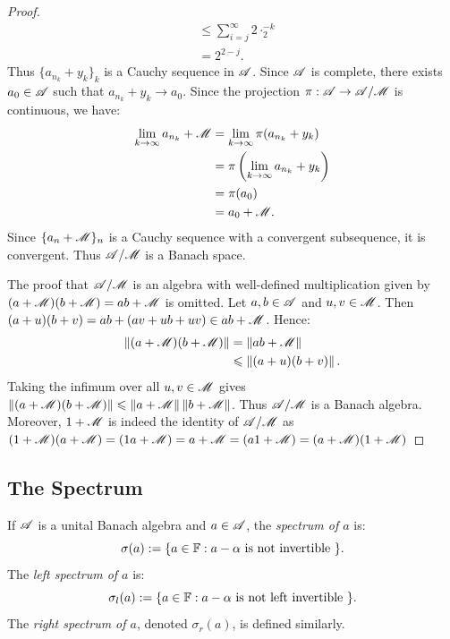 \begin{proof}
\begin{align*}
			&\leq \sum_{i=j}^{\infty} 2\cdot_2^{-k}  \\
			&= 2^{2-j}.
		\end{align*}
		Thus $\{a_{n_k} + y_k\}_k$ is a Cauchy sequence in $\mathscr{A}$. Since $\mathscr{A}$ is complete, there exists $a_0 \in \mathscr{A}$ such that $a_{n_k} + y_k \rightarrow a_0$. Since the projection $\pi:\mathscr{A} \rightarrow \mathscr{A}/\mathscr{M}$ is continuous, we have:
		\begin{align*}
			\lim_{k \rightarrow \infty}a_{n_k} + \mathscr{M}
			&= \lim_{k \rightarrow \infty} \pi(a_{n_k} + y_k) \\
			&= \pi\left(\lim_{k \rightarrow \infty} a_{n_k} + y_k \right) \\
			&= \pi(a_0) \\
			&= a_0 + \mathscr{M}.
		\end{align*}
		Since $\{a_n + \mathscr{M}\}_n$ is a Cauchy sequence with a convergent subsequence, it is convergent. Thus $\mathscr{A}/\mathscr{M}$ is a Banach space.

		The proof that $\mathscr{A}/\mathscr{M}$ is an algebra with well-defined multiplication given by $(a+\mathscr{M})(b+\mathscr{M}) = ab + \mathscr{M}$ is omitted. Let $a,b \in \mathscr{A}$ and $u,v \in \mathscr{M}$. Then $(a+u)(b+v) = ab + (av + ub + uv) \in ab+\mathscr{M}$. Hence:
		\begin{align*}
			\left\lVert (a+\mathscr{M})(b+\mathscr{M}) \right\rVert
			&= \left\lVert ab + \mathscr{M} \right\rVert \\
			&\leqslant \left\lVert (a+u)(b+v) \right\rVert.
		\end{align*}
		Taking the infimum over all $u,v \in \mathscr{M}$ gives $\left\lVert (a+\mathscr{M})(b+\mathscr{M}) \right\rVert \leqslant \left\lVert a+\mathscr{M} \right\rVert \left\lVert b+\mathscr{M} \right\rVert$. Thus $\mathscr{A}/\mathscr{M}$ is a Banach algebra. Moreover, $1 + \mathscr{M}$ is indeed the identity of $\mathscr{A}/\mathscr{M}$ as $(1+\mathscr{M})(a+\mathscr{M}) = (1a + \mathscr{M}) = a + \mathscr{M} = (a1 + \mathscr{M}) = (a + \mathscr{M})(1 + \mathscr{M})$
	\end{proof}

\subsection{The Spectrum}

\begin{definition}
	If $\mathscr{A}$ is a unital Banach algebra and $a \in \mathscr{A}$, the \emph{spectrum of $a$} is:
	\[
		\sigma(a) := \{a \in \mathbb{F} : a - \alpha \text{ is not invertible }\}.
	\] 
	The \emph{left spectrum of $a$} is:
	\[
		\sigma_l(a) := \{a \in \mathbb{F} : a - \alpha \text{ is not left invertible }\}.
	\] 
	The \emph{right spectrum of $a$}, denoted $\sigma_r(a)$, is defined similarly.
\end{definition}

